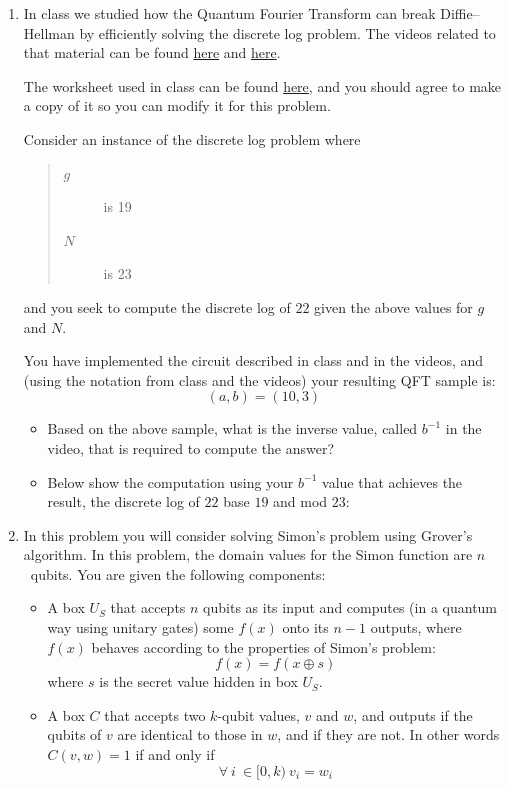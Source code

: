 \documentclass[12pt]{article}
\begin{document}
\begin{enumerate}
\clearpage\item{} In class we studied how the Quantum Fourier Transform can break Diffie--Hellman by efficiently solving the discrete log problem.  The videos related to that material can be found \href{https://www.youtube.com/watch?v=PV0d7vCHKN4}{here} and \href{https://www.youtube.com/watch?v=c1WRcu6Fy0A}{here}.

The worksheet used in class can be found \href{https://docs.google.com/spreadsheets/d/1Qwh1YE37pDFaL5EMaAeNVMR5B5i88K7mbeqsFHrLEUw/copy}{here}, and you should agree to make a copy of it so you can modify it for this problem.

Consider an instance of the discrete log problem where
\begin{quote}\begin{description}
    \item[$g$] is 19
    \item[$N$] is 23
\end{description}\end{quote}
and you seek to compute the discrete log of $22$ given the above values for $g$ and $N$.

You have implemented the circuit described in class and in the videos, and (using the notation from class and the videos) your resulting QFT sample is:
\[
(a,b) = (10,3)
\]
\begin{itemize}
    \item Based on the above sample, what is the inverse value, called $b^{-1}$ in the video, that is required to compute the answer?\Blank{}
    \item Below show the computation using your $b^{-1}$ value that achieves the result, the discrete log of $22$ base $19$ and mod $23$:

    \BigSkip{}
    
    \Blank[6in]{}
\end{itemize}


\clearpage\item{}  In this problem you will consider solving Simon's problem using Grover's algorithm.  In this problem, the domain values for the Simon function are $n$~qubits.  You are given the following components:
\begin{itemize}
    \item A box $U_S$ that accepts $n$ qubits as its input and computes (in a quantum way using unitary gates) some $f(x)$ onto its $n-1$ outputs, where $f(x)$ behaves according to the properties of Simon's problem:
    \[
    f(x) = f(x\oplus s)
    \]
    where $s$ is the secret value hidden in box $U_S$.
    \item A box $C$ that accepts two $k$-qubit values, $v$ and $w$, and outputs \QOne{} if the qubits of $v$ are identical to those in $w$, and \QZero{} if they are not.  In other words $C(v,w)=1$ if and only if
    \[
    \forall\ i\ \in [0,k)\ v_{i} = w_{i}
    \]
    

\end{itemize}
\end{enumerate}
\end{document}
